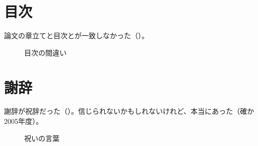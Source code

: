\section{目次}

論文の章立てと目次とが一致しなかった（）。

\begin{figure}[H]
  \centering
  \caption{目次の間違い}
  \label{fig:fail-index}
\end{figure}

\section{謝辞}

謝辞が祝辞だった（）。信じられないかもしれないけれど、本当にあった（確か2005年度）。

\begin{figure}[H]
    \centering
    \caption{祝いの言葉}
    \label{fig:fail-ack}
\end{figure}